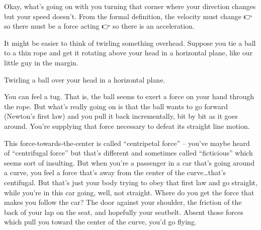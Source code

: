 \documentclass[
  letterpaper,
  DIV=11,
  numbers=noendperiod,
  oneside]{scrreprt}
\begin{document}
Okay, what's going on with you turning that corner where your direction
changes but your speed doesn't. From the formal definition, the velocity
must change 👉 so there must be a force acting 👉 so there is an
acceleration.

It might be easier to think of twirling something overhead. Suppose you
tie a ball to a thin rope and get it rotating above your head in a
horizontal plane, like our little guy in the margin.

\begin{marginfigure}


\caption{\label{fig-erad}Twirling a ball over your head in a horizontal
plane.}

\end{marginfigure}%

You can feel a tug. That is, the ball seems to exert a force on your
hand through the rope. But what's really going on is that the ball wants
to go forward (Newton's first law) and you pull it back incrementally,
bit by bit as it goes around. You're supplying that force necessary to
defeat its straight line motion.

This force-towards-the-center is called ``centripetal force'' -- you've
maybe heard of ``centrifugal force'' but that's different and sometimes
called ``ficticious'' which seems sort of insulting. But when you're a
passenger in a car that's going around a curve, you feel a force that's
away from the center of the curve\ldots that's centifugal. But that's
just your body trying to obey that first law and go straight, while
you're in this car going, well, not straight. Where do you get the force
that makes you follow the car? The door against your shoulder, the
friction of the back of your lap on the seat, and hopefully your
seatbelt. Absent those forces which pull you toward the center of the
curve, you'd go flying.
\end{document}
